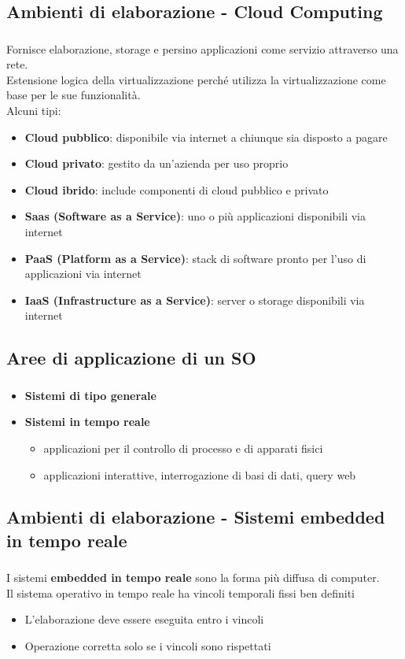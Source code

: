 \documentclass{beamer}
\newenvironment{mainframe}{
	\begin{frame}
		\frametitle{\insertsubsection}
		\framesubtitle{\insertsection}
	}{
	\end{frame}
}
\begin{document}
\subsection{Ambienti di elaborazione - Cloud Computing}
\begin{mainframe}
	Fornisce elaborazione, storage e persino applicazioni come servizio attraverso una rete.\\
	Estensione logica della virtualizzazione perché utilizza la virtualizzazione come base per le sue funzionalità.\\
	Alcuni tipi:
	\begin{itemize}
		\item \textbf{Cloud pubblico}: disponibile via internet a chiunque sia disposto a pagare
		\item \textbf{Cloud privato}: gestito da un'azienda per uso proprio
		\item \textbf{Cloud ibrido}: include componenti di cloud pubblico e privato
		\item \textbf{Saas (Software as a Service)}: uno o più applicazioni disponibili via internet
		\item \textbf{PaaS (Platform as a Service)}: stack di software pronto per l'uso di applicazioni via internet
		\item \textbf{IaaS (Infrastructure as a Service)}: server o storage disponibili via internet
	\end{itemize}
\end{mainframe}
\subsection{Aree di applicazione di un SO}
\begin{mainframe}
	\begin{itemize}
		\item \textbf{Sistemi di tipo generale}
		\item \textbf{Sistemi in tempo reale}
		\begin{itemize}
			\item applicazioni per il controllo di processo e di apparati fisici
			\item applicazioni interattive, interrogazione di basi di dati, query web
		\end{itemize}
	\end{itemize}
\end{mainframe}
\subsection{Ambienti di elaborazione - Sistemi embedded in tempo reale}
\begin{mainframe}
	I sistemi \textbf{embedded in tempo reale} sono la forma più diffusa di computer.\\
	Il sistema operativo in tempo reale ha vincoli temporali fissi ben definiti
	\begin{itemize}
		\item L'elaborazione deve essere eseguita entro i vincoli
		\item Operazione corretta solo se i vincoli sono rispettati
	\end{itemize} 
\end{mainframe}
\end{document}
